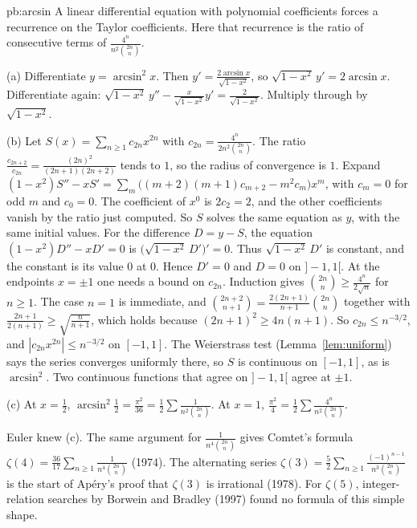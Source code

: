 \begin{solution}{pb:arcsin}
\idea A linear differential equation with polynomial coefficients forces a recurrence on the Taylor coefficients. Here that recurrence is the ratio of consecutive terms of $\frac{4^n}{n^2\binom{2n}n}$.

\writeup (a) Differentiate $y=\arcsin^2x$. Then $y'=\frac{2\arcsin x}{\sqrt{1-x^2}}$, so $\sqrt{1-x^2}\,y'=2\arcsin x$. Differentiate again: $\sqrt{1-x^2}\,y''-\frac x{\sqrt{1-x^2}}y'=\frac2{\sqrt{1-x^2}}$. Multiply through by $\sqrt{1-x^2}$.

(b) Let $S(x)=\sum_{n\ge1}c_{2n}x^{2n}$ with $c_{2n}=\frac{4^n}{2n^2\binom{2n}n}$. The ratio $\frac{c_{2n+2}}{c_{2n}}=\frac{(2n)^2}{(2n+1)(2n+2)}$ tends to $1$, so the radius of
convergence is $1$. Expand $(1-x^2)S''-xS'=\sum_m\bigl((m+2)(m+1)c_{m+2}-m^2c_m\bigr)x^m$, with $c_m=0$ for odd $m$ and $c_0=0$. The coefficient
of $x^0$ is $2c_2=2$, and the other coefficients vanish by the ratio just computed. So $S$ solves the same equation as $y$, with the same initial values.
For the difference $D=y-S$, the equation $(1-x^2)D''-xD'=0$ is $\bigl(\sqrt{1-x^2}\,D'\bigr)'=0$. Thus $\sqrt{1-x^2}\,D'$ is constant, and the constant is its value $0$ at $0$. Hence $D'=0$
and $D=0$ on $]-1,1[$. At the endpoints $x=\pm1$ one needs a bound on $c_{2n}$. Induction gives $\binom{2n}n\ge\frac{4^n}{2\sqrt n}$ for $n\ge1$. The case $n=1$ is immediate, and
$\binom{2n+2}{n+1}=\frac{2(2n+1)}{n+1}\binom{2n}n$ together with $\frac{2n+1}{2(n+1)}\ge\sqrt{\frac n{n+1}}$, which holds because $(2n+1)^2\ge4n(n+1)$. So $c_{2n}\le n^{-3/2}$, and
$|c_{2n}x^{2n}|\le n^{-3/2}$ on $[-1,1]$. The Weierstrass test (Lemma~\ref{lem:uniform}) says the series converges uniformly there, so $S$ is continuous on
$[-1,1]$, as is $\arcsin^2$. Two continuous functions that agree on $]-1,1[$ agree at $\pm1$.

(c) At $x=\frac12$, $\arcsin^2\frac12=\frac{\pi^2}{36}=\frac12\sum\frac1{n^2\binom{2n}n}$. At $x=1$, $\frac{\pi^2}4=\frac12\sum\frac{4^n}{n^2\binom{2n}n}$.

\leads Euler knew (c). The same argument for $\frac1{n^4\binom{2n}n}$ gives Comtet's formula $\zeta(4)=\frac{36}{17}\sum_{n\ge1}\frac1{n^4\binom{2n}n}$ (1974). The alternating
series $\zeta(3)=\frac52\sum_{n\ge1}\frac{(-1)^{n-1}}{n^3\binom{2n}n}$ is the start of Ap\'ery's proof that $\zeta(3)$ is irrational (1978). For $\zeta(5)$, integer-relation
searches by Borwein and Bradley (1997) found no formula of this simple shape.
\end{solution}

